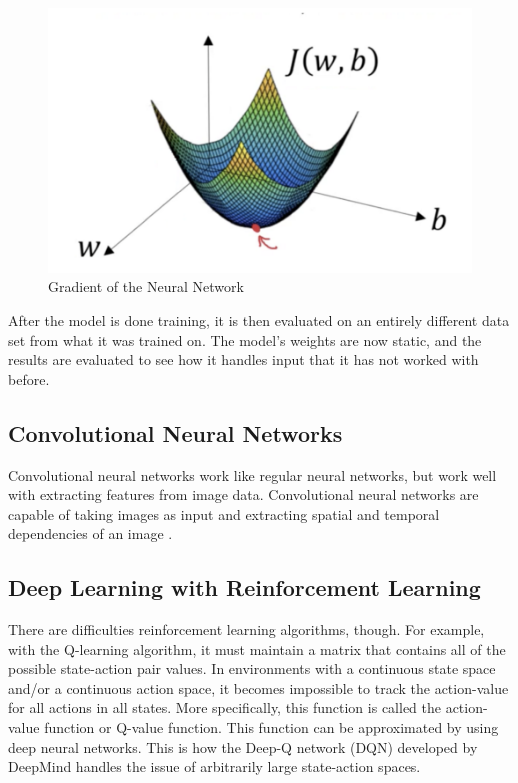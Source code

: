 \documentclass[12pt]{article}
\begin{document}
\begin{figure} [ht!]
    \centering
    \includegraphics[width=.8\textwidth, height=0.3\textheight]{gradient.png}
    \caption{Gradient of the Neural Network \cite{donges_donges_2018}}
    \label{fig:gradient}
\end{figure}

After the model is done training, it is then evaluated on an entirely different data set from what it was trained on.  The model’s weights are now static, and the results are evaluated to see how it handles input that it has not worked with before.    

%
%
\subsection*{Convolutional Neural Networks}
Convolutional neural networks work like regular neural networks, but work well with extracting features from image data.  Convolutional neural networks are capable of taking images as input and extracting spatial and temporal dependencies of an image \cite{saha_saha_2018} .

%
%
\subsection*{Deep Learning with Reinforcement Learning}

There are difficulties reinforcement learning algorithms, though.  For example, with the Q-learning algorithm, it must maintain a matrix that contains all of the possible state-action pair values.  In environments with a continuous state space and/or a continuous action space, it becomes impossible to track the action-value for all actions in all states.  More specifically, this function is called the action-value function or Q-value function.  This function can be approximated by using deep neural networks.  This is how the Deep-Q network (DQN) developed by DeepMind handles the issue of arbitrarily large state-action spaces.  
\end{document}
